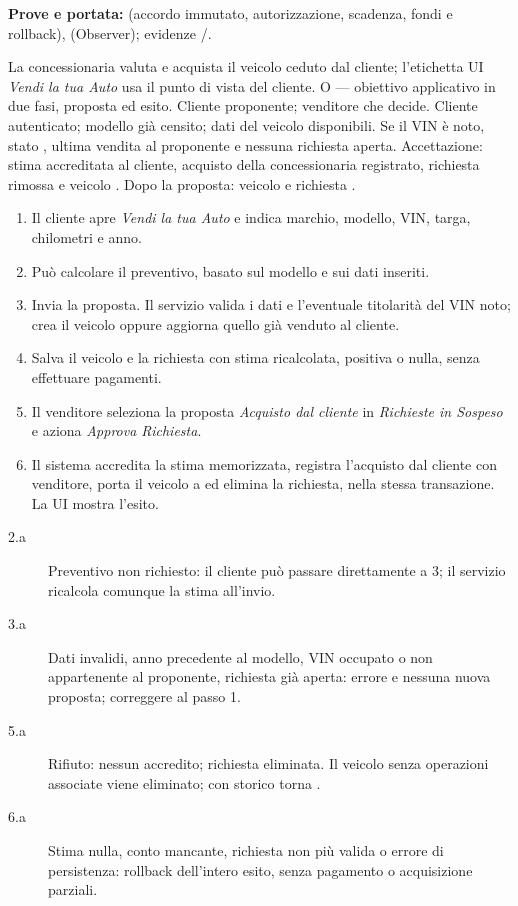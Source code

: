 \begin{flushleft}\noindent\textbf{Prove e portata:}  (accordo immutato, autorizzazione, scadenza, fondi e rollback),  (Observer); evidenze /.\end{flushleft}
\clearpage
{}
{La concessionaria valuta e acquista il veicolo ceduto dal cliente; l'etichetta UI \emph{Vendi la tua Auto} usa il punto di vista del cliente.}
{O --- obiettivo applicativo in due fasi, proposta ed esito.}
{Cliente proponente; venditore che decide.}
{Cliente autenticato; modello gi\`a censito; dati del veicolo disponibili.
Se il VIN \`e noto, stato , ultima vendita al proponente e nessuna richiesta aperta.}
{Accettazione: stima accreditata al cliente, acquisto della concessionaria registrato,
richiesta rimossa e veicolo . Dopo la proposta: veicolo  e richiesta .}
\principale
\begin{enumerate}
\item Il cliente apre \emph{Vendi la tua Auto} e indica marchio, modello,
  VIN, targa, chilometri e anno.
\item Pu\`o calcolare il preventivo, basato sul modello e sui dati inseriti.
\item Invia la proposta. Il servizio valida i dati e l'eventuale titolarit\`a
  del VIN noto; crea il veicolo oppure aggiorna quello gi\`a venduto al cliente.
\item Salva il veicolo  e la richiesta con stima ricalcolata,
  positiva o nulla, senza effettuare pagamenti.
\item Il venditore seleziona la proposta \emph{Acquisto dal cliente} in
  \emph{Richieste in Sospeso} e aziona \emph{Approva Richiesta}.
\item Il sistema accredita la stima memorizzata, registra l'acquisto dal cliente
  con venditore, porta il veicolo a  ed elimina la richiesta,
  nella stessa transazione. La UI mostra l'esito.
\end{enumerate}
\alternative
\begin{description}
\item[2.a] Preventivo non richiesto: il cliente pu\`o passare direttamente a 3;
  il servizio ricalcola comunque la stima all'invio.
\item[3.a] Dati invalidi, anno precedente al modello, VIN occupato o non
  appartenente al proponente, richiesta gi\`a aperta: errore e nessuna nuova proposta;
  correggere al passo 1.
\item[5.a] Rifiuto: nessun accredito; richiesta eliminata.
  Il veicolo senza operazioni associate viene eliminato; con storico torna .
\item[6.a] Stima nulla, conto mancante, richiesta non pi\`u valida o errore di persistenza:
  rollback dell'intero esito, senza pagamento o acquisizione parziali.
\end{description}
